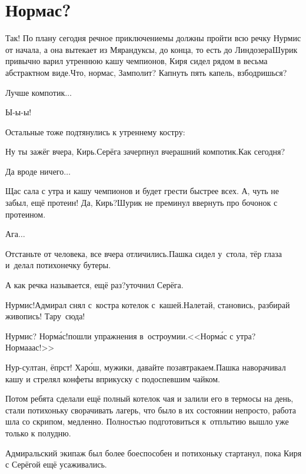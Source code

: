 \chapter{Нормас?}
\vepsianrose

\diagdash Так! По плану сегодня речное приключение\mdash мы должны пройти всю речку Нурмис от начала, а она вытекает из Мярандуксы, до конца, то есть до Линдозера\mdash Шурик привычно варил утреннюю кашу чемпионов, Киря сидел рядом в весьма абстрактном виде.\mdash Что, нормас, Замполит? Капнуть пять капель, взбодришься?

\diagdash Лучше компотик$\ldots$

\diagdash Ы-ы-ы!%

Остальные тоже подтянулись к утреннему костру:

\diagdash Ну ты зажёг вчера, Кирь.\mdash Серёга зачерпнул вчерашний компотик.\mdash Как сегодня?

\diagdash Да вроде ничего$\ldots$

\diagdash Щас сала с утра и кашу чемпионов и будет грести быстрее всех. А, чуть не забыл, ещё протеин! Да, Кирь?\mdash Шурик не преминул ввернуть про бочонок с протеином.

\diagdash Ага$\ldots$

\diagdash Отстаньте от человека, все вчера отличились.\mdash Пашка сидел у~стола, тёр глаза и~делал потихонечку бутеры.

\diagdash А как речка называется, ещё раз?\mdash уточнил Серёга.

\diagdash Нурмис!\mdash Адмирал снял с~костра котелок с~кашей.\mdash Налетай, становись, разбирай живопись! Тару~сюда!

\diagdash Нурмис? Норм{\'а}с!\mdash пошли упражнения в~остроумии.\mdash <<Норм{\'а}с с утра?  Норма\sdash а\sdash ас!>>

\diagdash Нур-султан, ёпрст! Хар{\'о}ш, мужики, давайте позавтракаем.\mdash Пашка наворачивал кашу и стрелял конфеты вприкуску с подоспевшим чайком.

Потом ребята сделали ещё полный котелок чая и залили его в термосы на день, стали потихоньку сворачивать лагерь, что было в их состоянии непросто, работа шла со скрипом, медленно. Полностью подготовиться к~отплытию вышло уже только к полудню.

Адмиральский экипаж был более боеспособен и потихоньку стартанул, пока Киря с Серёгой ещё усаживались. 

